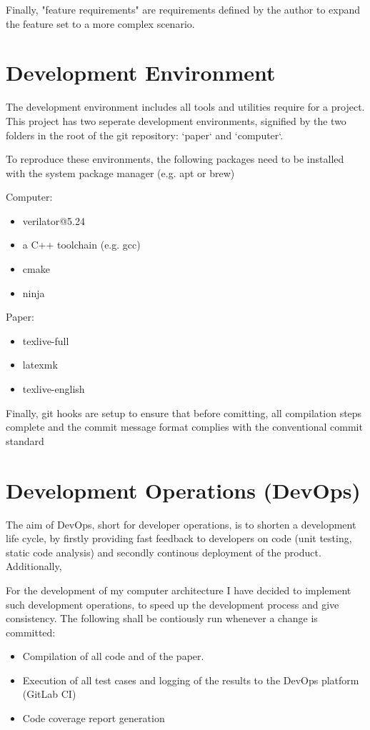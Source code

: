 Finally, "feature requirements" are requirements defined by the author to expand the feature set to a more complex scenario. 

\section{Development Environment}
The development environment includes all tools and utilities require for a project. This project has two seperate development environments, signified by the two folders in the root of the git repository: `paper` and `computer`. 

To reproduce these environments, the following packages need to be installed with the system package manager (e.g. apt or brew) 

Computer: 
\begin{itemize}
  \item verilator@5.24
  \item a C++ toolchain (e.g. gcc)
  \item cmake
  \item ninja
\end{itemize}

Paper:
\begin{itemize}
  \item texlive-full
  \item latexmk
  \item texlive-english
\end{itemize}


Finally, git hooks are setup to ensure that before comitting, all compilation steps complete and the commit message format complies with the conventional commit standard \cite{conventionalcommit}

\section{Development Operations (DevOps)}
The aim of DevOps, short for developer operations, is to shorten a development life cycle, by firstly providing fast feedback to developers on code (unit testing, static code analysis) and secondly continous deployment of the product. Additionally,   

For the development of my computer architecture I have decided to implement such development operations, to speed up the development process and give consistency. The following shall be contiously run whenever a change is committed:  

\begin{itemize}
  \item Compilation of all code and of the paper.  
  \item Execution of all test cases and logging of the results to the DevOps platform (GitLab CI)
  \item Code coverage report generation
\end{itemize}

